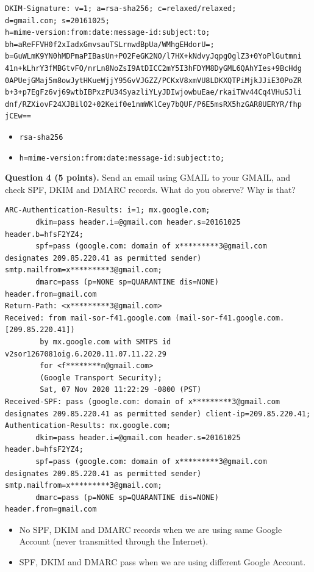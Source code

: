 \documentclass[11pt]{article}
\newcommand{\dmark}{{\sf DMARC}\xspace}
\newcommand{\dkim}{{\sf DKIM}\xspace}
\newcommand{\spf}{{\sf SPF}\xspace}
\begin{document}
\begin{enumerate}
\begin{lstlisting}
DKIM-Signature: v=1; a=rsa-sha256; c=relaxed/relaxed;
d=gmail.com; s=20161025;
h=mime-version:from:date:message-id:subject:to;
bh=aReFFVH0f2xIadxGmvsauTSLrnwdBpUa/WMhgEHdorU=;
b=GuWLmK9YN0hMDPmaPIBasUn+PO2FeGK2NO/l7HX+kNdvyJqpgOglZ3+0YoPlGutmni
41n+kLhrY3fMBGtvFO/nrLn8NoZsI9AtDICC2mY5I3hFDYM8DyGML6QAhYIes+9BcHdg
0APUejGMaj5m8owJytHKueWjjY95GvVJGZZ/PCKxV8xmVU8LDKXQTPiMjkJJiE30PoZR
b+3+p7EgFz6vj69wtbIBPxzPU34SyazliYLyJDIwjowbuEae/rkaiTWv44Cq4VHuSJli
dnf/RZXiovF24XJBilO2+02Keif0e1nmWKlCey7bQUF/P6E5msRX5hzGAR8UERYR/fhp
jCEw==
\end{lstlisting}\vspace{-6mm}

\begin{itemize}
  \item \texttt{rsa-sha256}
  \item \texttt{h=mime-version:from:date:message-id:subject:to;}
\end{itemize}

\textbf{Question 4 (5 points).} Send an email using GMAIL to your GMAIL, and check \spf, \dkim and \dmark records. What do you observe? Why is that?

\begin{lstlisting}
ARC-Authentication-Results: i=1; mx.google.com;
       dkim=pass header.i=@gmail.com header.s=20161025 header.b=hfsF2YZ4;
       spf=pass (google.com: domain of x*********3@gmail.com designates 209.85.220.41 as permitted sender) smtp.mailfrom=x*********3@gmail.com;
       dmarc=pass (p=NONE sp=QUARANTINE dis=NONE) header.from=gmail.com
Return-Path: <x*********3@gmail.com>
Received: from mail-sor-f41.google.com (mail-sor-f41.google.com. [209.85.220.41])
        by mx.google.com with SMTPS id v2sor1267081oig.6.2020.11.07.11.22.29
        for <f********n@gmail.com>
        (Google Transport Security);
        Sat, 07 Nov 2020 11:22:29 -0800 (PST)
Received-SPF: pass (google.com: domain of x*********3@gmail.com designates 209.85.220.41 as permitted sender) client-ip=209.85.220.41;
Authentication-Results: mx.google.com;
       dkim=pass header.i=@gmail.com header.s=20161025 header.b=hfsF2YZ4;
       spf=pass (google.com: domain of x*********3@gmail.com designates 209.85.220.41 as permitted sender) smtp.mailfrom=x*********3@gmail.com;
       dmarc=pass (p=NONE sp=QUARANTINE dis=NONE) header.from=gmail.com
\end{lstlisting}\vspace{-6mm}

\begin{itemize}
  \item No \spf, \dkim and \dmark records when we are using same Google Account (never transmitted through the Internet).
  \item \spf, \dkim and \dmark pass when we are using different Google Account.
\end{itemize}

\end{enumerate}
\end{document}
